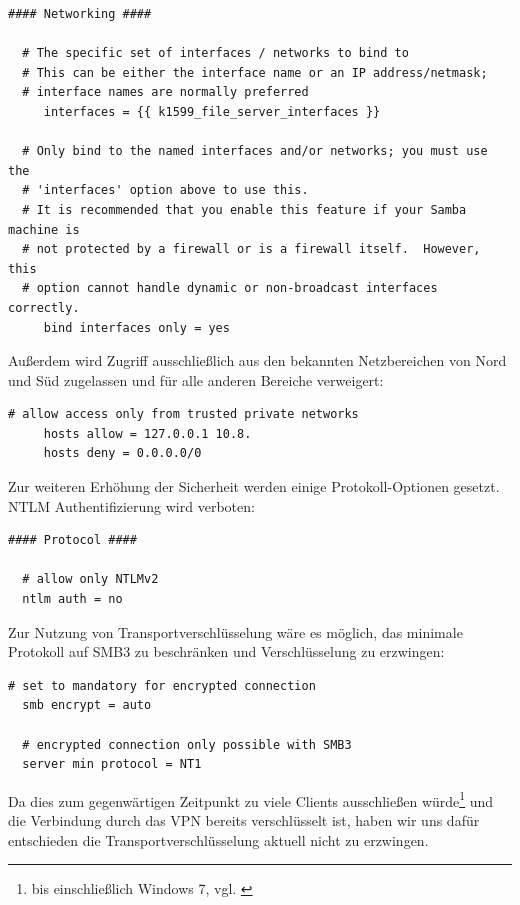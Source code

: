 \begin{lstlisting}[label=code:smbconf1,caption=Ausschnitt aus /etc/samba/smb.conf]
  #### Networking ####

  # The specific set of interfaces / networks to bind to
  # This can be either the interface name or an IP address/netmask;
  # interface names are normally preferred
     interfaces = {{ k1599_file_server_interfaces }}

  # Only bind to the named interfaces and/or networks; you must use the
  # 'interfaces' option above to use this.
  # It is recommended that you enable this feature if your Samba machine is
  # not protected by a firewall or is a firewall itself.  However, this
  # option cannot handle dynamic or non-broadcast interfaces correctly.
     bind interfaces only = yes
\end{lstlisting}

Außerdem wird Zugriff ausschließlich aus den bekannten Netzbereichen von Nord und Süd zugelassen und für alle anderen Bereiche verweigert:

\begin{lstlisting}[label=code:smbconf2,caption=Ausschnitt aus /etc/samba/smb.conf]
  # allow access only from trusted private networks
     hosts allow = 127.0.0.1 10.8.
     hosts deny = 0.0.0.0/0
\end{lstlisting}

Zur weiteren Erhöhung der Sicherheit werden einige Protokoll-Optionen gesetzt. NTLM Authentifizierung wird verboten:

\begin{lstlisting}[label=code:smbconf3,caption=Ausschnitt aus /etc/samba/smb.conf]
  #### Protocol ####

  # allow only NTLMv2
  ntlm auth = no
  \end{lstlisting}
Zur Nutzung von Transportverschlüsselung wäre es möglich, das minimale Protokoll auf SMB3 zu beschränken und Verschlüsselung zu erzwingen:
\begin{lstlisting}[label=code:smbconf4,caption=Möglicher Eintrag in /etc/samba/smb.conf]
  # set to mandatory for encrypted connection
  smb encrypt = auto

  # encrypted connection only possible with SMB3
  server min protocol = NT1
  \end{lstlisting}

Da dies zum gegenwärtigen Zeitpunkt zu viele Clients ausschließen würde\footnote{bis einschließlich Windows 7, vgl. \cite{smbHistory}} und die Verbindung durch das VPN bereits verschlüsselt ist, haben wir uns dafür entschieden die Transportverschlüsselung aktuell nicht zu erzwingen.

